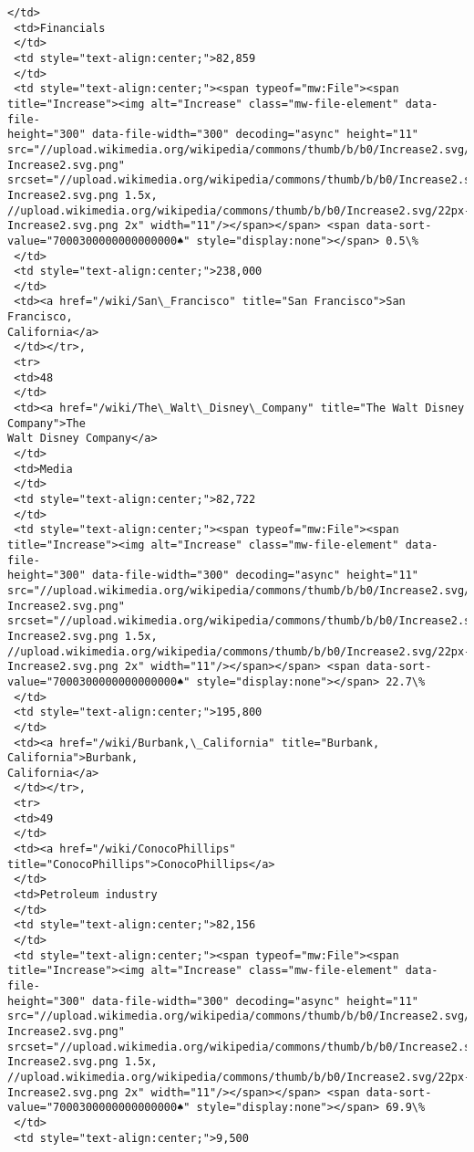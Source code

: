 \documentclass[11pt]{article}
\begin{document}
\begin{tcolorbox}[breakable, size=fbox, boxrule=.5pt, pad at break*=1mm, opacityfill=0]
\begin{Verbatim}[commandchars=\\\{\}]
 </td>
 <td>Financials
 </td>
 <td style="text-align:center;">82,859
 </td>
 <td style="text-align:center;"><span typeof="mw:File"><span
title="Increase"><img alt="Increase" class="mw-file-element" data-file-
height="300" data-file-width="300" decoding="async" height="11"
src="//upload.wikimedia.org/wikipedia/commons/thumb/b/b0/Increase2.svg/11px-
Increase2.svg.png"
srcset="//upload.wikimedia.org/wikipedia/commons/thumb/b/b0/Increase2.svg/17px-
Increase2.svg.png 1.5x,
//upload.wikimedia.org/wikipedia/commons/thumb/b/b0/Increase2.svg/22px-
Increase2.svg.png 2x" width="11"/></span></span> <span data-sort-
value="7000300000000000000♠" style="display:none"></span> 0.5\%
 </td>
 <td style="text-align:center;">238,000
 </td>
 <td><a href="/wiki/San\_Francisco" title="San Francisco">San Francisco,
California</a>
 </td></tr>,
 <tr>
 <td>48
 </td>
 <td><a href="/wiki/The\_Walt\_Disney\_Company" title="The Walt Disney Company">The
Walt Disney Company</a>
 </td>
 <td>Media
 </td>
 <td style="text-align:center;">82,722
 </td>
 <td style="text-align:center;"><span typeof="mw:File"><span
title="Increase"><img alt="Increase" class="mw-file-element" data-file-
height="300" data-file-width="300" decoding="async" height="11"
src="//upload.wikimedia.org/wikipedia/commons/thumb/b/b0/Increase2.svg/11px-
Increase2.svg.png"
srcset="//upload.wikimedia.org/wikipedia/commons/thumb/b/b0/Increase2.svg/17px-
Increase2.svg.png 1.5x,
//upload.wikimedia.org/wikipedia/commons/thumb/b/b0/Increase2.svg/22px-
Increase2.svg.png 2x" width="11"/></span></span> <span data-sort-
value="7000300000000000000♠" style="display:none"></span> 22.7\%
 </td>
 <td style="text-align:center;">195,800
 </td>
 <td><a href="/wiki/Burbank,\_California" title="Burbank, California">Burbank,
California</a>
 </td></tr>,
 <tr>
 <td>49
 </td>
 <td><a href="/wiki/ConocoPhillips" title="ConocoPhillips">ConocoPhillips</a>
 </td>
 <td>Petroleum industry
 </td>
 <td style="text-align:center;">82,156
 </td>
 <td style="text-align:center;"><span typeof="mw:File"><span
title="Increase"><img alt="Increase" class="mw-file-element" data-file-
height="300" data-file-width="300" decoding="async" height="11"
src="//upload.wikimedia.org/wikipedia/commons/thumb/b/b0/Increase2.svg/11px-
Increase2.svg.png"
srcset="//upload.wikimedia.org/wikipedia/commons/thumb/b/b0/Increase2.svg/17px-
Increase2.svg.png 1.5x,
//upload.wikimedia.org/wikipedia/commons/thumb/b/b0/Increase2.svg/22px-
Increase2.svg.png 2x" width="11"/></span></span> <span data-sort-
value="7000300000000000000♠" style="display:none"></span> 69.9\%
 </td>
 <td style="text-align:center;">9,500

\end{Verbatim}
\end{tcolorbox}
\end{document}
